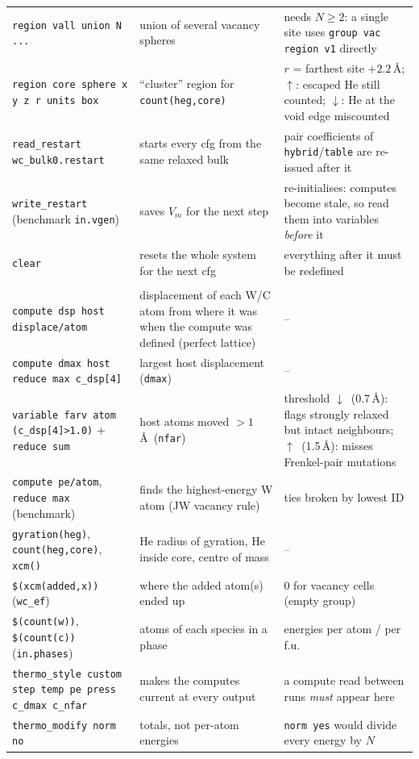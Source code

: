 \documentclass[10pt]{article}
\newcommand{\cmd}[1]{\texttt{\small #1}}
\newcommand{\up}{\textcolor{org}{$\uparrow$}}
\newcommand{\dn}{\textcolor{acc}{$\downarrow$}}
\begin{document}
\begin{xltabular}{\linewidth}{L{5.0cm} L{6.1cm} Y}
\cmd{region vall union N ...} & union of several vacancy spheres & needs $N\ge2$: a single site uses \cmd{group vac region v1} directly \\
\cmd{region core sphere x y z r units box} & ``cluster'' region for \cmd{count(heg,core)} & $r$ = farthest site $+2.2$\,\AA; \up: escaped He still counted; \dn: He at the void edge miscounted \\
\cmd{read\_restart wc\_bulk0.restart} & starts every cfg from the same relaxed bulk & pair coefficients of \cmd{hybrid}/\cmd{table} are re-issued after it \\
\cmd{write\_restart} (benchmark \cmd{in.vgen}) & saves $V_m$ for the next step & re-initialises: computes become stale, so read them into variables \emph{before} it \\
\cmd{clear} & resets the whole system for the next cfg & everything after it must be redefined \\
 \\
\cmd{compute dsp host displace/atom} & displacement of each W/C atom from where it was when the compute was defined (perfect lattice) & -- \\
\cmd{compute dmax host reduce max c\_dsp[4]} & largest host displacement (\cmd{dmax}) & -- \\
\cmd{variable farv atom (c\_dsp[4]>1.0)} + \cmd{reduce sum} & host atoms moved $>1$\,\AA\ (\cmd{nfar}) & threshold \dn\ (0.7\,\AA): flags strongly relaxed but intact neighbours; \up\ (1.5\,\AA): misses Frenkel-pair mutations \\
\cmd{compute pe/atom}, \cmd{reduce max} (benchmark) & finds the highest-energy W atom (JW vacancy rule) & ties broken by lowest ID \\
\cmd{gyration(heg)}, \cmd{count(heg,core)}, \cmd{xcm()} & He radius of gyration, He inside core, centre of mass & -- \\
\cmd{\$(xcm(added,x))} (\cmd{wc\_ef}) & where the added atom(s) ended up & 0 for vacancy cells (empty group) \\
\cmd{\$(count(w))}, \cmd{\$(count(c))} (\cmd{in.phases}) & atoms of each species in a phase & energies per atom / per f.u. \\
\cmd{thermo\_style custom step temp pe press c\_dmax c\_nfar} & makes the computes current at every output & a compute read between runs \emph{must} appear here \\
\cmd{thermo\_modify norm no} & totals, not per-atom energies & \cmd{norm yes} would divide every energy by $N$ \\

\end{xltabular}
\end{document}
